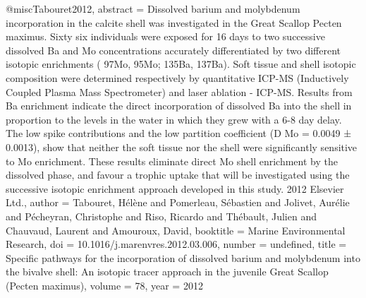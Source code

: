 @misc{Tabouret2012,
abstract = {Dissolved barium and molybdenum incorporation in the calcite shell was investigated in the Great Scallop Pecten maximus. Sixty six individuals were exposed for 16 days to two successive dissolved Ba and Mo concentrations accurately differentiated by two different isotopic enrichments ( 97Mo, 95Mo; 135Ba, 137Ba). Soft tissue and shell isotopic composition were determined respectively by quantitative ICP-MS (Inductively Coupled Plasma Mass Spectrometer) and laser ablation - ICP-MS. Results from Ba enrichment indicate the direct incorporation of dissolved Ba into the shell in proportion to the levels in the water in which they grew with a 6-8 day delay. The low spike contributions and the low partition coefficient (D Mo = 0.0049 ± 0.0013), show that neither the soft tissue nor the shell were significantly sensitive to Mo enrichment. These results eliminate direct Mo shell enrichment by the dissolved phase, and favour a trophic uptake that will be investigated using the successive isotopic enrichment approach developed in this study. {\textcopyright} 2012 Elsevier Ltd.},
author = {Tabouret, H{\'{e}}l{\`{e}}ne and Pomerleau, S{\'{e}}bastien and Jolivet, Aur{\'{e}}lie and P{\'{e}}cheyran, Christophe and Riso, Ricardo and Th{\'{e}}bault, Julien and Chauvaud, Laurent and Amouroux, David},
booktitle = {Marine Environmental Research},
doi = {10.1016/j.marenvres.2012.03.006},
number = {undefined},
title = {{Specific pathways for the incorporation of dissolved barium and molybdenum into the bivalve shell: An isotopic tracer approach in the juvenile Great Scallop (Pecten maximus)}},
volume = {78},
year = {2012}
}
